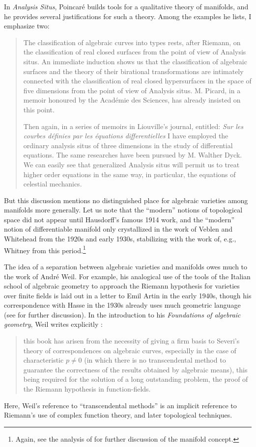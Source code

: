 \documentclass[11pt,leqno]{article}
\renewcommand{\1}{{\rm 1\hspace*{-0.4ex}%
\rule{0.1ex}{1.52ex}\hspace*{0.2ex}}}
\newcommand{\<}[1]{{\langle}#1 {\rangle}}
\newcounter{intro}
\theoremstyle{plain}
\theoremstyle{definition}
\theoremstyle{remark}
\numberwithin{equation}{subsection}
\begin{document}
In {\em Analysis Situs}, Poincar\'e builds tools for a qualitative theory of manifolds, and he provides several justifications for such a theory.  Among the examples he lists, I emphasize two:
\begin{quote}
	The classification of algebraic curves into types rests, after Riemann, on the classification of real closed surfaces from the point of view of Analysis situs. An immediate induction shows us that the classification of algebraic surfaces and the theory of their birational transformations are intimately connected with the classification of real closed hypersurfaces in the space of five dimensions from the point of view of Analysis situs. M. Picard, in a memoir honoured by the Acad\'emie des Sciences, has already insisted on this point.
	
	Then again, in a series of memoirs in Liouville's journal, entitled: {\em Sur les courbes d\'efinies par les \'equations differentielles} I have employed the ordinary analysis situs of three dimensions in the study of differential equations. The same researches have been pursued by M. Walther Dyck. We can easily see that generalized Analysis situs will permit us to treat higher order equations in the same way, in particular, the equations of celestial mechanics.
\end{quote}
But this discussion mentions no distinguished place for algebraic varieties among manifolds more generally.  Let us note that the ``modern'' notions of topological space did not appear until Hausdorff's famous 1914 work, and the ``modern'' notion of differentiable manifold only crystallized in the work of Veblen and Whitehead from the 1920s and early 1930s, stabilizing with the work of, e.g., Whitney from this period.\footnote{Again, see the analysis of \cite{Scholz} for further discussion of the manifold concept.}

The idea of a separation between algebraic varieties and manifolds owes much to the work of Andr\'e Weil.  For example, his analogical use of the tools of the Italian school of algebraic geometry to approach the Riemann hypothesis for varieties over finite fields is laid out in a letter to Emil Artin in the early 1940s, though his correspondence with Hasse in the 1930s already uses much geometric language (see \cite[Chapter 10]{roquette2018riemann} for further discussion).  In the introduction to his {\em Foundations of algebraic geometry}, Weil writes explicitly \cite{WeilFoundations}:
\begin{quote}
	this book has arisen from the necessity of giving a firm basis to Severi's theory of correspondences on algebraic curves, especially in the case of characteristic $p \neq 0$ (in which there is no transcendental method to guarantee the correctness 
	of the results obtained by algebraic means), this being required for the solution of a long outstanding problem, the proof of the Riemann hypothesis in function-fields. 
\end{quote}
Here, Weil's reference to ``transcendental methods'' is an implicit reference to Riemann's use of complex function theory, and later topological techniques.
\end{document}
